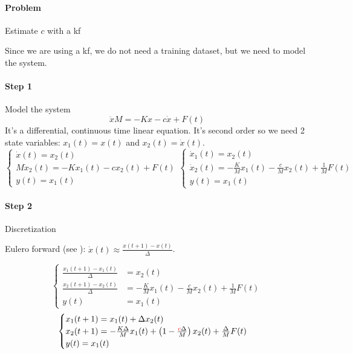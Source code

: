 \begin{example}
    \paragraph{Problem} Estimate $c$ with a \gls{kf}

    Since we are using a \gls{kf}, we do not need a training dataset, but we need to model the system.

    \paragraph{Step 1} Model the system
    \[
        \ddot{x}M = -Kx - c\dot{x} + F(t)
    \]
    It's a differential, continuous time linear equation.
    It's second order so we need 2 state variables: $x_1(t) = x(t)$ and $x_2(t) = \dot{x}(t)$.
    \[
        \begin{cases}
            \dot{x}(t) = x_2(t) \\
            M\dot{x}_2(t) = -Kx_1(t) -cx_2(t) + F(t) \\
            y(t) = x_1(t)
        \end{cases}
        \begin{cases}
            \dot{x}_1(t) = x_2(t) \\
            \dot{x}_2(t) = -\frac{K}{M} x_1(t) - \frac{c}{M} x_2(t) + \frac{1}{M}F(t) \\
            y(t) = x_1(t)
        \end{cases}
    \]

    \paragraph{Step 2} Discretization

    Eulero forward (see ): $\dot{x}(t) \approx \frac{x(t+1)-x(t)}{\Delta}$.

    \[
        \begin{cases}
            \frac{x_1(t+1)-x_1(t)}{\Delta} &= x_2(t) \\
            \frac{x_2(t+1)-x_2(t)}{\Delta} &= -\frac{K}{M} x_1(t) - \frac{c}{M} x_2(t) + \frac{1}{M}F(t) \\
            y(t) &= x_1(t)
        \end{cases}
    \]
    \[
        \begin{cases}
            x_1(t+1) = x_1(t) + \Delta x_2(t) \\
            x_2(t+1) = -\frac{K\Delta}{M}x_1(t) + \left(1-\frac{{\color{red}c}\Delta}{M}\right)x_2(t) + \frac{\Delta}{M}F(t) \\
            y(t) = x_1(t)
        \end{cases}
    \]


\end{example}
